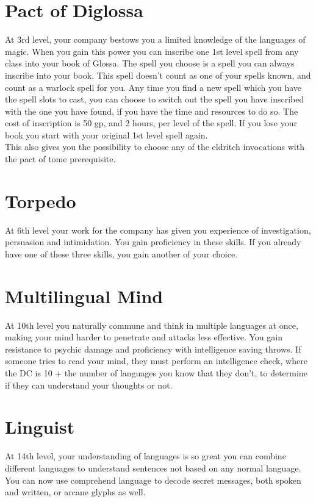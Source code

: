 \documentclass[11pt, A4paper, english]{article}
\begin{document}
	\section*{Pact of Diglossa}
At 3rd level, your company bestows you a limited knowledge of the languages of magic. When you gain this power you can inscribe one 1st level spell from any class into your book of Glossa. The spell you choose is a spell you can always inscribe into your book. This spell doesn't count as one of your spells known, and count as a warlock spell for you. Any time you find a new spell which you have the spell slots to cast, you can choose to switch out the spell you have inscribed with the one you have found, if you have the time and resources to do so. The cost of inscription is 50 gp, and 2 hours, per level of the spell. If you lose your book you start with your original 1st level spell again. \\
This also gives you the possibility to choose any of the eldritch invocations with the pact of tome prerequisite.

	\section*{Torpedo}
At 6th level your work for the company has given you experience of investigation, persuasion and intimidation. You gain proficiency in these skills. If you already have one of these three skills, you gain another of your choice.
	
	\section*{Multilingual Mind}
At 10th level you naturally commune and think in multiple languages at once, making your mind harder to penetrate and attacks less effective. You gain resistance to psychic damage and proficiency with intelligence saving throws. If someone tries to read your mind, they must perform an intelligence check, where the DC is 10 + the number of languages you know that they don't, to determine if they can understand your thoughts or not.

	\section*{Linguist}
At 14th level, your understanding of languages is so great you can combine different languages to understand sentences not based on any normal language. You can now use comprehend language to decode secret messages, both spoken and written, or arcane glyphs as well.
\end{document}
